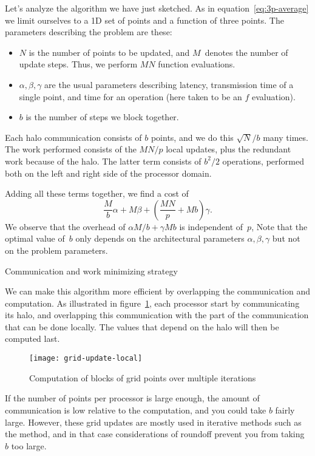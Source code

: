 Let's analyze the algorithm we have just sketched.  As in
equation~\eqref{eq:3p-average} we limit ourselves to a 1D set of
points and a function of three points. The parameters describing the
problem are these:
\begin{itemize}
\item $N$ is the number of points to be updated, and $M$~denotes the
  number of update steps. Thus, we perform $MN$ function evaluations.
\item $\alpha,\beta,\gamma$ are the usual parameters describing
  latency, transmission time of a single point, and time for an
  operation (here taken to be an $f$ evaluation).
\item $b$ is the number of steps we block together.
\end{itemize}
Each halo communication consists of $b$ points, and we do this $\sqrt
N/b$ many times.  The work performed consists of the $MN/p$ local
updates, plus the redundant work because of the halo. The latter term
consists of $b^2/2$ operations, performed both on the left and right
side of the processor domain.

Adding all these terms together, we find a cost of
\[ \frac Mb\alpha+M\beta+\left(\frac {MN}p+Mb\right)\gamma. \]
We observe that the overhead of $\alpha M/b+\gamma Mb$ is independent of~$p$,
Note that  the optimal value of~$b$ only depends on
  the architectural parameters $\alpha,\beta,\gamma$ but not on the
  problem parameters.

 {Communication and work minimizing strategy}

We can make this algorithm more efficient by overlapping the
communication and computation. As illustrated in
figure~\ref{fig:grid-update-local}, each processor start by
communicating its halo, and overlapping this communication with the
part of the communication that can be done locally. The values that
depend on the halo will then be computed last.

\begin{figure}[ht]
\texttt{[image: grid-update-local]}
\caption{Computation of blocks of grid points over multiple iterations}
\label{fig:grid-update-local}
\end{figure}

If the number of points per processor is large enough, the amount of
communication is low relative to the computation, and you could take
$b$ fairly large. However, these grid updates are mostly used in
iterative methods such as the  method, and in that case
considerations of roundoff prevent you from taking $b$ too
large\cite{ChGe:sstep}.

